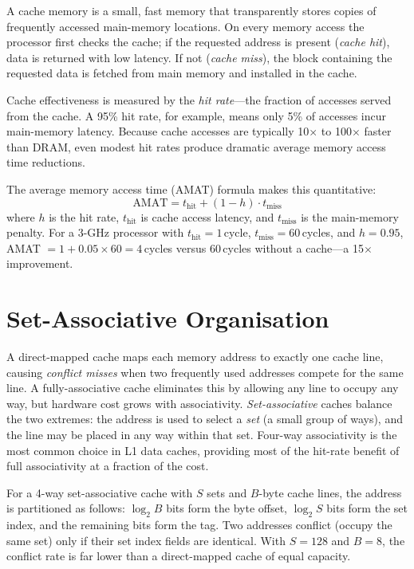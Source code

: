 \documentclass[12pt,letterpaper]{report}
\begin{document}
A cache memory is a small, fast memory that transparently stores copies
of frequently accessed main-memory locations.  On every memory access
the processor first checks the cache; if the requested address is
present (\emph{cache hit}), data is returned with low latency.  If not
(\emph{cache miss}), the block containing the requested data is fetched
from main memory and installed in the cache.

Cache effectiveness is measured by the \emph{hit rate}---the fraction
of accesses served from the cache.  A 95\% hit rate, for example, means
only 5\% of accesses incur main-memory latency.  Because cache accesses
are typically 10$\times$ to 100$\times$ faster than DRAM, even modest
hit rates produce dramatic average memory access time reductions.

The average memory access time (AMAT) formula makes this quantitative:
\[
  \text{AMAT} = t_{\text{hit}} + (1 - h)\cdot t_{\text{miss}}
\]
where $h$ is the hit rate, $t_{\text{hit}}$ is cache access latency,
and $t_{\text{miss}}$ is the main-memory penalty.  For a 3-GHz
processor with $t_{\text{hit}} = 1$\,cycle, $t_{\text{miss}} = 60$\,cycles,
and $h = 0.95$, AMAT $= 1 + 0.05 \times 60 = 4$\,cycles versus
60\,cycles without a cache---a 15$\times$ improvement.

\section{Set-Associative Organisation}

A direct-mapped cache maps each memory address to exactly one cache
line, causing \emph{conflict misses} when two frequently used addresses
compete for the same line.  A fully-associative cache eliminates this
by allowing any line to occupy any way, but hardware cost grows with
associativity.  \emph{Set-associative} caches balance the two extremes:
the address is used to select a \emph{set} (a small group of ways), and
the line may be placed in any way within that set.  Four-way
associativity is the most common choice in L1 data caches, providing
most of the hit-rate benefit of full associativity at a fraction of the
cost.

For a 4-way set-associative cache with $S$ sets and $B$-byte cache
lines, the address is partitioned as follows: $\log_2 B$ bits form the
byte offset, $\log_2 S$ bits form the set index, and the remaining bits
form the tag.  Two addresses conflict (occupy the same set) only if
their set index fields are identical.  With $S = 128$ and $B = 8$, the
conflict rate is far lower than a direct-mapped cache of equal capacity.
\end{document}
